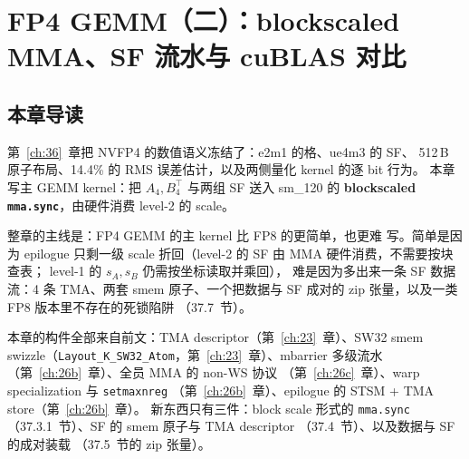 \chapter{FP4 GEMM（二）：blockscaled MMA、SF 流水与 cuBLAS 对比}\label{ch:37}

\section{本章导读}

第~\ref{ch:36}~章把 NVFP4 的数值语义冻结了：e2m1 的格、ue4m3 的 SF、
512\,B 原子布局、14.4\% 的 RMS 误差估计，以及两侧量化 kernel 的逐 bit 行为。
本章写主 GEMM kernel：把 $A_4,B_4^{\top}$ 与两组 SF 送入 sm\_120 的
\textbf{blockscaled \texttt{mma.sync}}，由硬件消费 level-2 的 scale。

整章的主线是：FP4 GEMM 的主 kernel 比 FP8 的更简单，也更难
写。简单是因为 epilogue 只剩一级 scale 折回（level-2 的 SF 由 MMA 硬件消费，不需要按块查表；
level-1 的 $s_A,s_B$ 仍需按坐标读取并乘回），
难是因为多出来一条 SF 数据流：4 条 TMA、两套 smem 原子、一个把数据与 SF
成对的 zip 张量，以及一类 FP8 版本里不存在的死锁陷阱
（37.7~节）。

本章的构件全部来自前文：TMA descriptor（第~\ref{ch:23}~章）、SW32 smem
swizzle（\texttt{Layout\_K\_SW32\_Atom}，第~\ref{ch:23}~章）、mbarrier
多级流水（第~\ref{ch:26b}~章）、全员 MMA 的 non-WS 协议
（第~\ref{ch:26c}~章）、warp specialization 与 \texttt{setmaxnreg}
（第~\ref{ch:26b}~章）、epilogue 的 STSM + TMA store（第~\ref{ch:26b}~章）。
新东西只有三件：block scale 形式的 \texttt{mma.sync}
（37.3.1~节）、SF 的 smem 原子与 TMA descriptor
（37.4~节）、以及数据与 SF 的成对装载
（37.5~节的 zip 张量）。

